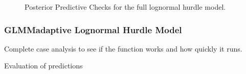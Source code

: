 \documentclass[
  letterpaper,
  DIV=11,
  numbers=noendperiod]{scrartcl}
\begin{document}
\begin{figure}

\begin{minipage}[t]{0.33\linewidth}

{\centering 


}

\end{minipage}%
%
\begin{minipage}[t]{0.33\linewidth}

{\centering 


}

\end{minipage}%
%
\begin{minipage}[t]{0.33\linewidth}

{\centering 


}

\end{minipage}%

\caption{\label{fig-ppc-brm2}Posterior Predictive Checks for the full
lognormal hurdle model.}

\end{figure}

\hypertarget{glmmadaptive-lognormal-hurdle-model}{%
\subsubsection{GLMMadaptive Lognormal Hurdle
Model}\label{glmmadaptive-lognormal-hurdle-model}}

Complete case analysis to see if the function works and how quickly it
runs.

Evaluation of predictions
\end{document}
